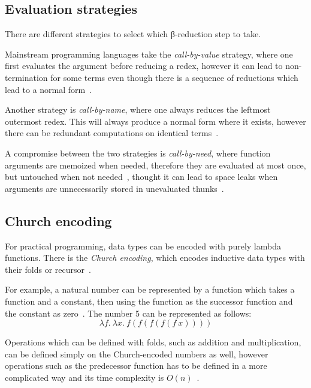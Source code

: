 \subsection{Evaluation strategies}\label{ssec:strat}

There are different strategies to select which β-reduction step to take.

Mainstream programming languages take the \emph{call-by-value} strategy, where
one first evaluates the argument before reducing a redex, however it can lead to
non-termination for some terms even though there is a sequence of reductions
which lead to a normal form~\cite{sicp, lambda-Sestoft, type-Pierce}.

Another strategy is \emph{call-by-name}, where one always reduces the leftmost
outermost redex. This will always produce a normal form where it exists, however
there can be redundant computations on identical terms~\cite{sicp,
  lambda-Sestoft}.

A compromise between the two strategies is \emph{call-by-need}, where function
arguments are memoized when needed, therefore they are evaluated at most once,
but untouched when not needed~\cite{functional-Hudak, callbyneed}, thought it
can lead to space leaks when arguments are unnecessarily stored in unevaluated
thunks~\cite{spaceleak}.

\subsection{Church encoding}\label{ssec:church}

For practical programming, data types can be encoded with purely lambda
functions. There is the \emph{Church encoding}, which encodes inductive data
types with their folds or recursor~\cite{church-Koopman, scott-Jansen}.

For example, a natural number can be represented by a function which takes a
function and a constant, then using the function as the successor function and
the constant as zero~\cite{lambda-Revesz, lambda-Church, type-Pierce}. The
number 5 can be represented as follows:
\begin{equation}
  \lambda f.\ \lambda x.\ f (f (f (f (f\ x))))
  \label{eq:lambda-church-ex}
\end{equation}

Operations which can be defined with folds, such as addition and multiplication,
can be defined simply on the Church-encoded numbers as well, however operations
such as the predecessor function has to be defined in a more complicated way and
its time complexity is \(O(n)\)~\cite{lambda-Revesz, type-Pierce}.

